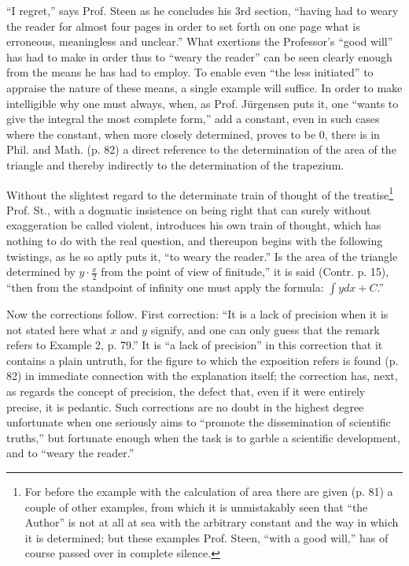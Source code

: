 \documentclass[12pt,a4paper,openany]{book}
\newcommand{\opage}[1]{\marginnote{\footnotesize\textit{[#1]}}}
\begin{document}
``I regret,'' says Prof. Steen as he concludes
his 3rd section, ``having had to weary the reader for almost
four pages in order to set forth on one page what is erroneous, meaningless and
unclear.'' What exertions the Professor's
``good will'' has had to make in order thus to ``weary
the reader'' can be seen clearly enough from the means he has had to
employ. To enable even ``the less initiated'' to
appraise the nature of these means, a single
example will suffice. In order to make intelligible why
one must always, when, as Prof. Jürgensen puts it,
one ``wants to give the integral the most complete form,'' add
a constant, even in such cases where the constant,
when more closely determined, proves to be $0$, there is
in Phil. and Math. (p. 82) a direct reference to the determination
of the area of the triangle and thereby indirectly to the determination of
the trapezium.

\opage{32}\setcounter{footnote}{0}%
Without the slightest regard to the determinate train of thought of the treatise\footnote{For before the example with the calculation of area there are given (p. 81)
a couple of other examples, from which it is unmistakably seen that ``the Author''
is not at all at sea with the arbitrary constant and the
way in which it is determined; but these examples Prof.
Steen, ``with a good will,'' has of course passed over in complete silence.} Prof. St., with a dogmatic insistence on being right that
can surely without exaggeration be called violent, introduces his own train of thought, which has nothing to do with the
real question, and thereupon begins with the following twistings, as he so aptly
puts it, ``to weary the reader.'' Is the area of the triangle determined by $y \cdot \frac{x}{2}$ from the point of view of finitude,''
it is said (Contr. p. 15), ``then from the standpoint of infinity one must apply the formula: $\int y dx + C$.''

Now the corrections follow. First correction: ``It is a
lack of precision when it is not stated here what $x$ and
$y$ signify, and one can only guess that the remark
refers to Example 2, p. 79.'' It is ``a lack of precision'' in this
correction that it contains
a plain untruth, for the figure to which the exposition
refers is found (p. 82) in immediate connection with the
explanation itself; the correction has, next, as regards the concept of precision, the defect that, even if it were
entirely precise, it is pedantic. Such corrections are no doubt in
the highest degree unfortunate when one seriously aims to
``promote the dissemination of scientific truths,'' but
fortunate enough when the task is to garble a scientific
development, and to ``weary the reader.''
\end{document}
